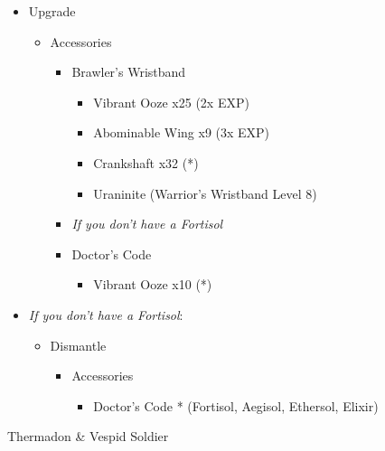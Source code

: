 \begin{paracol}{2}
	\begin{upgrade}
		\begin{itemize}
			\item Upgrade
			      \begin{itemize}
				      \item Accessories
				            \begin{itemize}
					            \item Brawler's Wristband
					                  \begin{itemize}
						                  \item Vibrant Ooze x25 (2x EXP)
						                  \item Abominable Wing x9 (3x EXP)
						                  \item Crankshaft x32 (*)
						                  \item Uraninite (Warrior's Wristband Level 8)
					                  \end{itemize}
					            \item \textit{If you don't have a Fortisol}
					            \item Doctor's Code
					                  \begin{itemize}
						                  \item Vibrant Ooze x10 (*)
					                  \end{itemize}
				            \end{itemize}
			      \end{itemize}
			\item \textit{If you don't have a Fortisol}:
			      \begin{itemize}
				      \item Dismantle
				            \begin{itemize}
					            \item Accessories
					                  \begin{itemize}
						                  \item Doctor's Code * (Fortisol, Aegisol, Ethersol, Elixir)
					                  \end{itemize}
				            \end{itemize}
			      \end{itemize}
		\end{itemize}
	\end{upgrade}
	\switchcolumn*
	\begin{battle}{Thermadon \& Vespid Soldier}
		\begin{itemize}

\end{itemize}
\end{battle}
\end{paracol}
